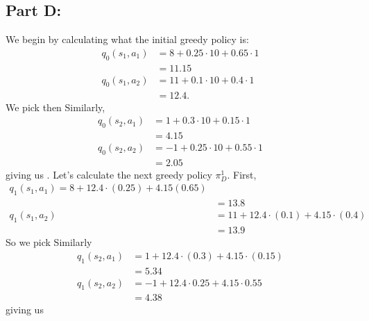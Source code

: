 \documentclass{article}
\begin{document}
\subsection*{Part D:} We begin by calculating what the initial greedy policy is:
\begin{align*}
	q_0(s_1, a_1) &= 8 + 0.25\cdot 10 + 0.65 \cdot 1\\
	&= 11.15\\
	q_0(s_1, a_2) &= 11 + 0.1\cdot 10 + 0.4 \cdot 1\\
	&= 12.4.
\end{align*}
We pick then  Similarly,
\begin{align*}
	q_0(s_2, a_1) &= 1 + 0.3 \cdot 10 + 0.15 \cdot 1\\
	&= 4.15\\
	q_0(s_2, a_2) &= -1 + 0.25 \cdot 10 + 0.55 \cdot 1\\
	&= 2.05
\end{align*}
giving us . Let's calculate the next greedy policy $\pi_D^1$. First,
\begin{align*}
	q_1(s_1, a_1) = 8 + 12.4\cdot(0.25) + 4.15(0.65)\\
	&= 13.8\\
	q_1(s_1, a_2) &= 11 + 12.4\cdot (0.1) + 4.15\cdot (0.4)\\
	&= 13.9
\end{align*}
So we pick  Similarly
\begin{align*}
	q_1(s_2, a_1) &= 1 + 12.4\cdot(0.3) + 4.15\cdot (0.15)\\
	&= 5.34\\
	q_1(s_2, a_2) &= -1 + 12.4\cdot 0.25 + 4.15\cdot 0.55\\
	&= 4.38
\end{align*}
giving us \\
\end{document}
